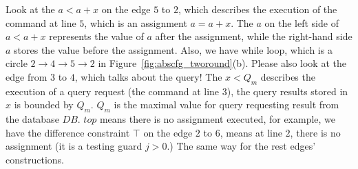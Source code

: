 Look at the $a < a+x $ on the edge $5$ to $2$, which describes the execution of the command at line $5$, which is an assignment $a = a+x$. The $a$ on the left side of $a < a+x$ represents the value of $a$ after the assignment, while the right-hand side $a$ stores the value before the assignment. 
Also, we have while loop, which is a circle $2 \to 4 \to 5 \to 2$ in Figure~\ref{fig:abscfg_tworound}(b). 
Please also look at the edge from $3$ to $4$, which talks about the query! The $x < Q_m$ describes the execution of a query request (the command at line 3), the query results stored in $x$ is bounded by $Q_m$. 
$Q_m$ is the maximal value for query requesting result from the database $DB$. $top$ means there is no assignment executed, for example, we have the difference constraint $\top$ on the edge $2$ to $6$, means at line $2$, there is no assignment (it is a testing guard $j>0$.) 
%
The same way for the rest edges' constructions.
